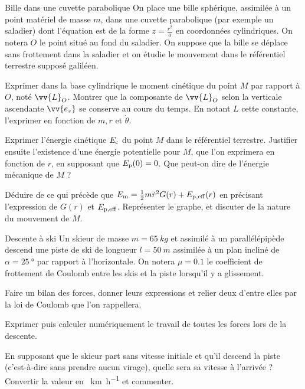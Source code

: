 \begin{exo}[PCSI]{Bille dans une cuvette parabolique}
On place une bille sphérique, assimilée à un point matériel de masse $m$, dans une cuvette parabolique (par exemple un saladier) dont l'équation est de la forme $z=\frac{r^2}{a}$ en coordonnées cylindriques. On notera $O$ le point situé au fond du saladier. On suppose que la bille se déplace sans frottement dans la saladier et on étudie le mouvement dans le référentiel terrestre supposé galiléen.
\begin{quest}
\item Exprimer dans la base cylindrique le moment cinétique du point $M$ par rapport à $O$, noté $\vv{L}_O$. Montrer que la composante de $\vv{L}_O$ selon la verticale ascendante $\vv{e_z}$ se conserve au cours du temps. En notant $L$ cette constante, l'exprimer en fonction de $m,r$ et $\dot{\theta}$.
\item Exprimer l'énergie cinétique $E_{\rm{c}}$ du point $M$ dans le référentiel terrestre. Justifier ensuite l'existence d'une énergie potentielle pour $M$, que l'on exprimera en fonction de $r$, en supposant que $E_{\rm{p}}(0)=0$. Que peut-on dire de l'énergie mécanique de $M$ ?
\item Déduire de ce qui précède que $E_{\rm{m}}=\frac{1}{2}m\dot{r}^2G(r)+E_{\rm{p,eff}}(r)$ en précisant l'expression de $G(r)$ et $E_{\rm{p,eff}}$. Représenter le graphe, et discuter de la nature du mouvement de $M$.
\end{quest}
\end{exo}

\begin{exo}[PCSI]{Descente à ski}
Un skieur de masse $m=\SI{65}{kg}$ et assimilé à un parallélépipède descend une piste de ski de longueur $l=\SI{50}{m}$ assimilée à un plan incliné de $\alpha=\SI{25}{\degree}$ par rapport à l'horizontale. On notera $\mu=\num{0,1}$ le coefficient de frottement de Coulomb entre les skis et la piste lorsqu'il y a glissement.
\begin{quest}
\item Faire un bilan des forces, donner leurs expressions et relier deux d'entre elles par la loi de Coulomb que l'on rappellera.
\item Exprimer puis calculer numériquement le travail de toutes les forces lors de la descente.
\item En supposant que le skieur part sans vitesse initiale et qu'il descend la piste  (c'est-à-dire sans prendre aucun virage), quelle sera sa vitesse à l'arrivée ? Convertir la valeur en \SI{}{km.h^{-1}} et commenter.
\end{quest}
\end{exo}

